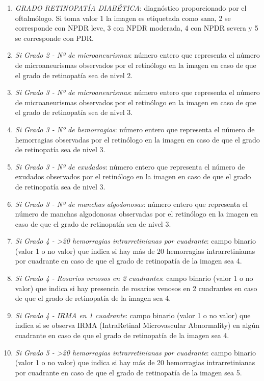 \begin{enumerate}[itemsep=0.25em]
    \item \textit{GRADO RETINOPATÍA DIABÉTICA}: diagnóstico proporcionado por el oftalmólogo. Si toma valor 1 la imagen es etiquetada como sana, 2 se corresponde con NPDR leve, 3 con NPDR moderada, 4 con NPDR severa y 5 se corresponde con PDR.
    \item \textit{Si Grado 2 - Nº de microaneurismas}: número entero que representa el número de microaneurismas observados por el retinólogo en la imagen en caso de que el grado de retinopatía sea de nivel 2.
    \item \textit{Si Grado 3 - Nº de microaneurismas}: número entero que representa el número de microaneurismas observados por el retinólogo en la imagen en caso de que el grado de retinopatía sea de nivel 3.
    \item \textit{Si Grado 3 - Nº de hemorragias}: número entero que representa el número de hemorragias observadas por el retinólogo en la imagen en caso de que el grado de retinopatía sea de nivel 3.
    \item \textit{Si Grado 3 - Nº de exudados}: número entero que representa el número de exudados observados por el retinólogo en la imagen en caso de que el grado de retinopatía sea de nivel 3.
    \item \textit{Si Grado 3 - Nº de manchas algodonosas}: número entero que representa el número de manchas algodonosas observadas por el retinólogo en la imagen en caso de que el grado de retinopatía sea de nivel 3.
    \item \textit{Si Grado 4 - >20 hemorragias intrarretinianas por cuadrante}: campo binario (valor 1 o no valor) que indica si hay más de 20 hemorragias intrarretinianas por cuadrante en caso de que el grado de retinopatía de la imagen sea 4.
    \item \textit{Si Grado 4 - Rosarios venosos en 2 cuadrantes}: campo binario (valor 1 o no valor) que indica si hay presencia de rosarios venosos en 2 cuadrantes en caso de que el grado de retinopatía de la imagen sea 4.
    \item \textit{Si Grado 4 - IRMA en 1 cuadrante}: campo binario (valor 1 o no valor) que indica si se observa IRMA (IntraRetinal Microvascular Abnormality) en algún cuadrante en caso de que el grado de retinopatía de la imagen sea 4.
     \item \textit{Si Grado 5 - >20 hemorragias intrarretinianas por cuadrante}: campo binario (valor 1 o no valor) que indica si hay más de 20 hemorragias intrarretinianas por cuadrante en caso de que el grado de retinopatía de la imagen sea 5.

\end{enumerate}
